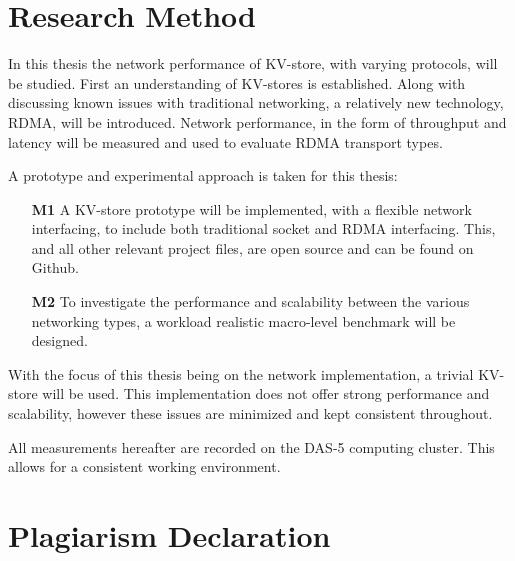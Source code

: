 \section{Research Method}
In this thesis the network performance of KV-store, with varying protocols, will be studied. 
First an understanding of KV-stores is established.
Along with discussing known issues with traditional networking, a relatively new technology, RDMA, will be introduced.
Network performance, in the form of throughput and latency will be measured and used to evaluate RDMA transport types.

A prototype and experimental approach is taken for this thesis:
\begin{itemize}
    \item[\textbf{M1}] A KV-store prototype will be implemented, with a flexible network interfacing, to include both traditional socket and RDMA interfacing.
    This, and all other relevant project files, are open source and can be found on Github\cite{github}.
    \item[\textbf{M2}] To investigate the performance and scalability between the various networking types, a workload realistic\cite{atikoglu2012workload} macro-level benchmark will be designed.
\end{itemize}

With the focus of this thesis being on the network implementation, a trivial KV-store will be used.
This implementation does not offer strong performance and scalability, however these issues are minimized and kept consistent throughout.

All measurements hereafter are recorded on the DAS-5 computing cluster.
This allows for a consistent working environment.

%
%

\section{Plagiarism Declaration}


